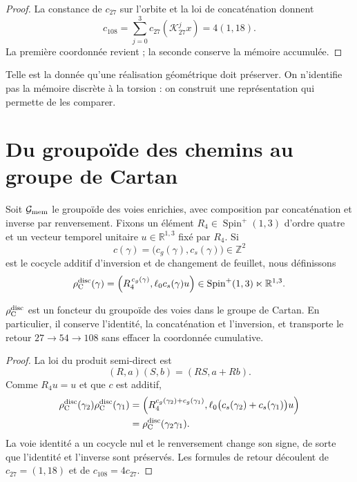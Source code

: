 \begin{proof}
La constance de \(c_{27}\) sur l'orbite et la loi de concaténation donnent
\[
 c_{108}=\sum_{j=0}^{3}c_{27}(\mathcal K_{27}^jx)
 =4(1,18).
\]
La première coordonnée revient ; la seconde conserve la mémoire accumulée.
\end{proof}

Telle est la donnée qu'une réalisation géométrique doit préserver. On n'identifie pas
la mémoire discrète à la torsion : on construit une représentation
qui permette de les comparer.

\section{Du groupoïde des chemins au groupe de Cartan}

Soit \(\mathcal G_{\rm mem}\) le groupoïde des voies enrichies, avec
composition par concaténation et inverse par renversement. Fixons un élément
\(R_4\in\operatorname{Spin}^+(1,3)\) d'ordre quatre et un vecteur temporel
unitaire \(u\in\mathbb R^{1,3}\) fixé par \(R_4\). Si
\[
c(\gamma)=\bigl(c_g(\gamma),c_s(\gamma)\bigr)\in\mathbb Z^2
\]
est le cocycle additif d'inversion et de changement de feuillet, nous définissons
\[
\rho_{\rm C}^{\rm disc}(\gamma)
=
\left(
R_4^{\,c_g(\gamma)},
\ell_0c_s(\gamma)u
\right)
\in\operatorname{Spin}^+(1,3)\ltimes\mathbb R^{1,3}.
\]

\begin{theorem}
\label{thm:realizacion-discreta-cartan-rev6}
\(\rho_{\rm C}^{\rm disc}\) est un foncteur du groupoïde des voies dans le groupe de
Cartan. En particulier, il conserve l'identité, la concaténation et l'inversion, et
transporte le retour \(27\to54\to108\) sans effacer la coordonnée cumulative.
\end{theorem}

\begin{proof}
La loi du produit semi-direct est
\[
(R,a)(S,b)=(RS,a+Rb).
\]
Comme \(R_4u=u\) et que \(c\) est additif,
\[
\begin{aligned}
\rho_{\rm C}^{\rm disc}(\gamma_2)
\rho_{\rm C}^{\rm disc}(\gamma_1)
&=
\left(
R_4^{c_g(\gamma_2)+c_g(\gamma_1)},
\ell_0\bigl(c_s(\gamma_2)+c_s(\gamma_1)\bigr)u
\right)\\
&=\rho_{\rm C}^{\rm disc}(\gamma_2\gamma_1).
\end{aligned}
\]
La voie identité a un cocycle nul et le renversement change son signe, de sorte
que l'identité et l'inverse sont préservés. Les formules de retour découlent de
\(c_{27}=(1,18)\) et de \(c_{108}=4c_{27}\).
\end{proof}

